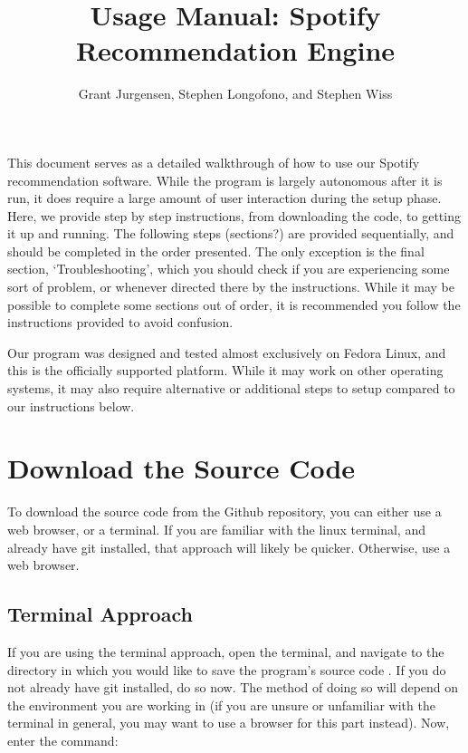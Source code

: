 \documentclass{roffin}
\begin{document}
\title{Usage Manual: Spotify Recommendation Engine}

\author{Grant Jurgensen, Stephen Longofono, and Stephen Wiss}

\maketitle

This document serves as a detailed walkthrough of how to use our Spotify recommendation software. While the program is largely autonomous after it is run, it does require a large amount of user interaction during the setup phase. Here, we provide step by step instructions, from downloading the code, to getting it up and running. The following steps (sections?) are provided sequentially, and should be completed in the order presented. The only exception is the final section, `Troubleshooting', which you should check if you are experiencing some sort of problem, or whenever directed there by the instructions. While it may be possible to complete some sections out of order, it is recommended you follow the instructions provided to avoid confusion.

Our program was designed and tested almost exclusively on Fedora Linux, and this is the officially supported platform. While it may work on other operating systems, it may also require alternative or additional steps to setup compared to our instructions below.

\section{Download the Source Code}
To download the source code from the Github repository, you can either use a web browser, or a terminal. If you are familiar with the linux terminal, and already have git installed, that approach will likely be quicker. Otherwise, use a web browser.

\subsection{Terminal Approach}
If you are using the terminal approach, open the terminal, and navigate to the directory in which you would like to save the program's source code . If you do not already have git installed, do so now. The method of doing so will depend on the environment you are working in (if you are unsure or unfamiliar with the terminal in general, you may want to use a browser for this part instead). Now, enter the command:
\newline
\end{document}
